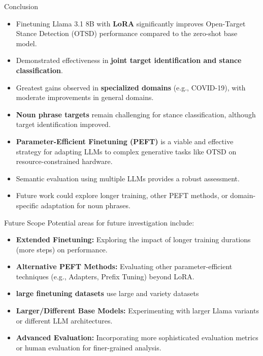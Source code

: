 \documentclass{beamer}
\begin{document}
\begin{frame}{Conclusion}
  \begin{itemize}
    \item Finetuning Llama 3.1 8B with \textbf{LoRA} significantly improves Open-Target Stance Detection (OTSD) performance compared to the zero-shot base model.
    \medskip
    \item Demonstrated effectiveness in \textbf{joint target identification and stance classification}.
    \medskip
    \item Greatest gains observed in \textbf{specialized domains} (e.g., COVID-19), with moderate improvements in general domains.
    \medskip
    \item \textbf{Noun phrase targets} remain challenging for stance classification, although target identification improved.
    \medskip
    \item \textbf{Parameter-Efficient Finetuning (PEFT)} is a viable and effective strategy for adapting LLMs to complex generative tasks like OTSD on resource-constrained hardware.
    \medskip
    \item Semantic evaluation using multiple LLMs provides a robust assessment.
    \medskip
    \item Future work could explore longer training, other PEFT methods, or domain-specific adaptation for noun phrases.
  \end{itemize}
\end{frame}

\begin{frame}{Future Scope}
  Potential areas for future investigation include:
  \begin{itemize}
    \item \textbf{Extended Finetuning:} Exploring the impact of longer training durations (more steps) on performance.
    \medskip
    \item \textbf{Alternative PEFT Methods:} Evaluating other parameter-efficient techniques (e.g., Adapters, Prefix Tuning) beyond LoRA.
    \medskip
    \item \textbf{large finetuning datasets} use large and variety datasets
    \medskip
    \item \textbf{Larger/Different Base Models:} Experimenting with larger Llama variants or different LLM architectures.
    \medskip
    \item \textbf{Advanced Evaluation:} Incorporating more sophisticated evaluation metrics or human evaluation for finer-grained analysis.
    \medskip
    
  \end{itemize}
\end{frame}
\end{document}
